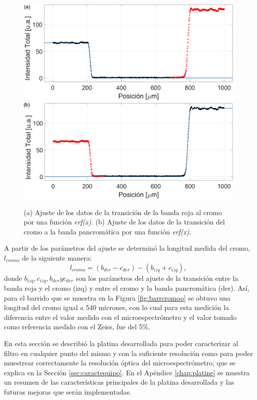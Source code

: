 \begin{figure}[H]
\hfill%
\includegraphics[scale=0.25]{Figs/microespectrometro/ajustebarrladoizq.png}
\hfill%
\includegraphics[scale=0.25]{Figs/microespectrometro/ajustebarrladoder.png}
\hfill%
\hfill%
\caption{(a) Ajuste de los datos de la transición de la banda roja al cromo por una función \textit{erf(x)}. (b) Ajuste de los datos de la transición del cromo a la banda pancromática por una función \textit{erf(x)}.}
\label{fig:ajustess}
\end{figure}

A partir de los parámetros del ajuste se determinó la longitud medida del cromo, $l_{cromo}$ de la siguiente manera:
\begin{equation}
l_{cromo} = (b_{der} - c_{der}) - (b_{izq} + c_{izq}),
\end{equation}
donde $b_{izq}, c_{izq}, b_{der} yc_{der}$ son los parámetros del ajuste de la transición entre la banda roja y el cromo (izq) y entre el cromo y la banda pancromática (der). Así, para el barrido que se muestra en la Figura \ref{fig:barrcromoo} se obtuvo una longitud del cromo igual a 540 micrones, con lo cual para esta medición la diferencia entre el valor medido con el microespectrómetro y el valor tomado como referencia medido con el Zeiss, fue del 5\%.

En esta sección se describió la platina desarrollada para poder caracterizar al filtro en cualquier punto del mismo y con la suficiente resolución como para poder muestrear correctamente la resolución óptica del microespectrómetro, que se explica en la Sección \ref{sec:caractequipo}. En el Apéndice \ref{chap:platine} se muestra un resumen de las características principales de la platina desarrollada y las futuras mejoras que serán implementadas.


